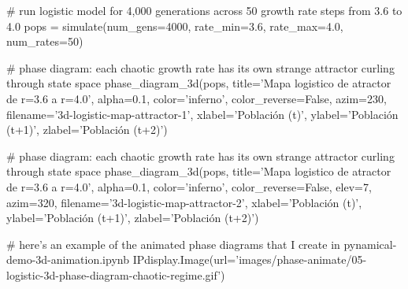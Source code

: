 \documentclass[a4paper,12pt]{article}
\begin{document}
\# run logistic model for 4,000 generations across 50 growth rate steps from 3.6 to 4.0
pops = simulate(num\_gens=4000, rate\_min=3.6, rate\_max=4.0, num\_rates=50)

\# phase diagram: each chaotic growth rate has its own strange attractor curling through state space
phase\_diagram\_3d(pops, title='Mapa logistico de atractor de r=3.6 a r=4.0', alpha=0.1, color='inferno', color\_reverse=False, 
                 azim=230, filename='3d-logistic-map-attractor-1',
                 xlabel='Población (t)', ylabel='Población (t+1)', zlabel='Población (t+2)')
                 
\# phase diagram: each chaotic growth rate has its own strange attractor curling through state space
phase\_diagram\_3d(pops, title='Mapa logistico de atractor de r=3.6 a r=4.0', alpha=0.1, color='inferno', color\_reverse=False, 
                 elev=7, azim=320, filename='3d-logistic-map-attractor-2', 
                 xlabel='Población (t)', ylabel='Población (t+1)', zlabel='Población (t+2)')
                 
\# here's an example of the animated phase diagrams that I create in pynamical-demo-3d-animation.ipynb
IPdisplay.Image(url='images/phase-animate/05-logistic-3d-phase-diagram-chaotic-regime.gif')
\end{document}
